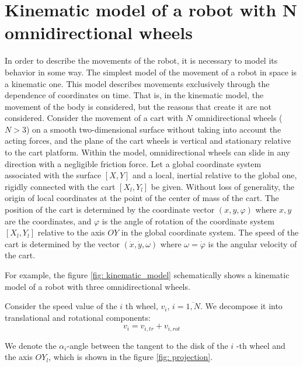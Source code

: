 \documentclass[oneside,final,14pt]{extreport}
\begin{document}
\chapter{Kinematic model of a robot with N omnidirectional wheels}
In order to describe the movements of the robot, it is necessary to model its behavior in some way. The simplest model of the movement of a robot in space is a kinematic one. This model describes movements exclusively through the dependence of coordinates on time. That is, in the kinematic model, the movement of the body is considered, but the reasons that create it are not considered.
Consider the movement of a cart with $ N $ omnidirectional wheels ($ N> 3 $) on a smooth two-dimensional surface without taking into account the acting forces, and the plane of the cart wheels is vertical and stationary relative to the cart platform. Within the model, omnidirectional wheels can slide in any direction with a negligible friction force. Let a global coordinate system associated with the surface $ [X, Y] $ and a local, inertial relative to the global one, rigidly connected with the cart $ [X_{l}, Y_{l}] $ be given. Without loss of generality, the origin of local coordinates at the point of the center of mass of the cart. The position of the cart is determined by the coordinate vector $ (x, y, \varphi) $
where $ x, y $ are the coordinates, and $ \varphi $ is the angle of rotation of the coordinate system $ [X_{l}, Y_{l}] $ relative to the axis $ OY $ in the global coordinate system. The speed of the cart is determined by the vector $ (\dot{x}, \dot{y}, \omega) $ where $ \omega = \dot{\varphi} $ is the angular velocity of the cart.

For example, the figure \ref{fig: kinematic_model} schematically shows a kinematic model of a robot with three omnidirectional wheels.
\begin{figure} [H]
\end{figure}

Consider the speed value of the $ i $ th wheel, $ v_{i} $, $ i = \overline{1, N} $. We decompose it into translational and rotational components:
\begin{equation}
v_{i}
=
v_{i, tr} + v_{i, rot}
\end{equation}

We denote the $ \alpha_{i} $-angle between the tangent to the disk of the $ i $ -th wheel and the axis $ OY_{l} $, which is shown in the figure
\ref{fig: projection}.
\begin{figure} [H]
\end{figure}
\end{document}

